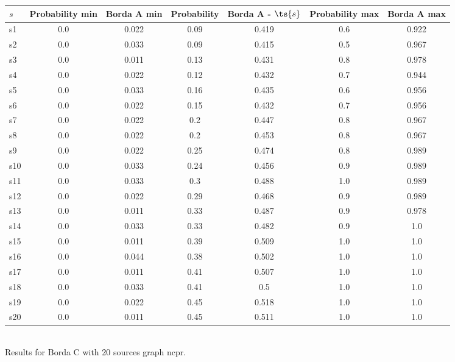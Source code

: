 \documentclass{article}
\begin{document}
\noindent\begin{tabular}{|l|c|c|c|c|c|c|}
\hline
$s$& Probability min & Borda A min & Probability & Borda A - $\ts{s}$ & Probability max & Borda A max\\
\hline
s1 &0.0 & 0.022 & 0.09 & 0.419 & 0.6 & 0.922\\
\hline
s2 &0.0 & 0.033 & 0.09 & 0.415 & 0.5 & 0.967\\
\hline
s3 &0.0 & 0.011 & 0.13 & 0.431 & 0.8 & 0.978\\
\hline
s4 &0.0 & 0.022 & 0.12 & 0.432 & 0.7 & 0.944\\
\hline
s5 &0.0 & 0.033 & 0.16 & 0.435 & 0.6 & 0.956\\
\hline
s6 &0.0 & 0.022 & 0.15 & 0.432 & 0.7 & 0.956\\
\hline
s7 &0.0 & 0.022 & 0.2 & 0.447 & 0.8 & 0.967\\
\hline
s8 &0.0 & 0.022 & 0.2 & 0.453 & 0.8 & 0.967\\
\hline
s9 &0.0 & 0.022 & 0.25 & 0.474 & 0.8 & 0.989\\
\hline
s10 &0.0 & 0.033 & 0.24 & 0.456 & 0.9 & 0.989\\
\hline
s11 &0.0 & 0.033 & 0.3 & 0.488 & 1.0 & 0.989\\
\hline
s12 &0.0 & 0.022 & 0.29 & 0.468 & 0.9 & 0.989\\
\hline
s13 &0.0 & 0.011 & 0.33 & 0.487 & 0.9 & 0.978\\
\hline
s14 &0.0 & 0.033 & 0.33 & 0.482 & 0.9 & 1.0\\
\hline
s15 &0.0 & 0.011 & 0.39 & 0.509 & 1.0 & 1.0\\
\hline
s16 &0.0 & 0.044 & 0.38 & 0.502 & 1.0 & 1.0\\
\hline
s17 &0.0 & 0.011 & 0.41 & 0.507 & 1.0 & 1.0\\
\hline
s18 &0.0 & 0.033 & 0.41 & 0.5 & 1.0 & 1.0\\
\hline
s19 &0.0 & 0.022 & 0.45 & 0.518 & 1.0 & 1.0\\
\hline
s20 &0.0 & 0.011 & 0.45 & 0.511 & 1.0 & 1.0\\
\hline
\end{tabular}\\

\noindent Results for Borda C with 20 sources graph ncpr.
\end{document}
